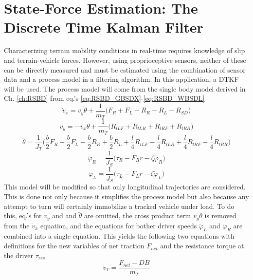 \section{State-Force Estimation: The Discrete Time Kalman Filter}
\label{s:DTKF}
Characterizing terrain mobility conditions in real-time requires knowledge of slip and terrain-vehicle forces. However, using proprioceptive sensors, neither of these can be directly measured and must be estimated using the combination of sensor data and a process model in a filtering algorithm. In this application, a DTKF will be used. The process model will come from the single body model derived in Ch. \ref{ch:RSBD} from eq.'s \ref{eq:RSBD_GBSDX}-\ref{eq:RSBD_WBSDL}
\begin{equation*}
    \dot v_x = v_y\dot\theta + \frac{1}{m_T}\Big(F_R + F_L - R_R - R_L - R_{SD} \Big)
\end{equation*}
\begin{equation*}
    \dot v_y = -v_x\dot\theta + \frac{1}{m_T}\Big(R_{lLF} + R_{lLR} + R_{lRF} + R_{lRR} \Big)
\end{equation*}
\begin{equation*}
    \ddot\theta = \frac{1}{J_T} \Bigg( \frac{b}{2}F_R - \frac{b}{2}F_L - \frac{b}{2}R_R + \frac{b}{2}R_L + \frac{l}{4}R_{lLF} - \frac{l}{4}R_{lLR} + \frac{l}{4}R_{lRF} - \frac{l}{4}R_{lRR} \Bigg)
\end{equation*}
\begin{equation*}
    \ddot\varphi_R = \frac{1}{J_S}\Big(\tau_R - F_Rr - \zeta\dot\varphi_R\Big)
\end{equation*}
\begin{equation*}
   \ddot\varphi_L = \frac{1}{J_S}\Big(\tau_L - F_Lr - \zeta\dot\varphi_L\Big)
\end{equation*}
This model will be modified so that only longitudinal trajectories are considered. This is done not only because it simplifies the process model but also because any attempt to turn will certainly immobilize a tracked vehicle under load. To do this, eq.'s for $\dot v_y$ and and $\ddot\theta$ are omitted, the cross product term $v_y\dot\theta$ is removed from the $\dot v_x$ equation, and the equations for bother driver speeds $\ddot\varphi_L$ and $\ddot\varphi_R$ are combined into a single equation. This yields the following two equations with definitions for the new variables of net traction $F_{net}$ and the resistance torque at the driver $\tau_{res}$
\begin{equation}
    \label{eq:DTKF_GBSD1}
    \dot v_T = \frac{F_{net}-DB}{m_T}
\end{equation}
